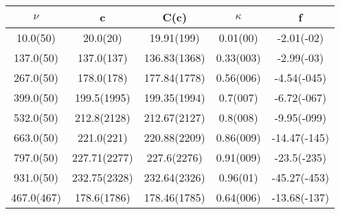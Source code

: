 \begin{table}[H]
	\centering
	\begin{tabular}{ccccc}
		$\nu$ & c & C(c) & $\kappa$ & f\\
		\hline
		10.0(50) & 20.0(20) & 19.91(199) & 0.01(00) & -2.01(-02)	\\
		137.0(50) & 137.0(137) & 136.83(1368) & 0.33(003) & -2.99(-03)	\\
		267.0(50) & 178.0(178) & 177.84(1778) & 0.56(006) & -4.54(-045)	\\
		399.0(50) & 199.5(1995) & 199.35(1994) & 0.7(007) & -6.72(-067)	\\
		532.0(50) & 212.8(2128) & 212.67(2127) & 0.8(008) & -9.95(-099)	\\
		663.0(50) & 221.0(221) & 220.88(2209) & 0.86(009) & -14.47(-145)	\\
		797.0(50) & 227.71(2277) & 227.6(2276) & 0.91(009) & -23.5(-235)	\\
		931.0(50) & 232.75(2328) & 232.64(2326) & 0.96(01) & -45.27(-453)	\\
		467.0(467) & 178.6(1786) & 178.46(1785) & 0.64(006) & -13.68(-137)	\\
	\end{tabular}
\end{table}